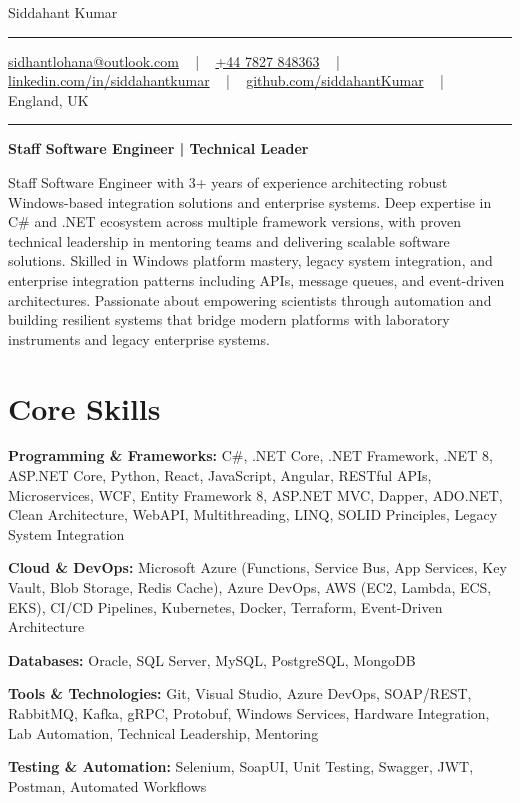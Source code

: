 \documentclass[letterpaper,10pt]{article}
\newcommand{\documentTitle}[2]{
  \begin{center}
    \vspace*{-0.3in}
    {\Huge\color{accentTitle} #1}
    \vspace{8pt}
    {\color{accentLine} \hrule}
    \vspace{2pt}
    \footnotesize{#2}
    \vspace{2pt}
    {\color{accentLine} \hrule}
  \end{center}
}
\newenvironment{resume_list}{
  \vspace{-7pt}
  \begin{itemize}[itemsep=-2px, parsep=1pt, leftmargin=30pt]
}{
  \end{itemize}
}
\begin{document}
\documentTitle{Siddahant Kumar}{
\vspace{0.1cm}
\href{mailto:sidhantlohana@outlook.com}{sidhantlohana@outlook.com} ~ | ~
\href{tel:+447827848363}{+44 7827 848363} ~ | ~
\href{https://www.linkedin.com/in/siddahantkumar/}{linkedin.com/in/siddahantkumar} ~ | ~
\href{https://github.com/siddahantKumar}{github.com/siddahantKumar} ~ | ~
England, UK
}

\begin{center}
\textbf{Staff Software Engineer | Technical Leader}
\end{center}

Staff Software Engineer with 3+ years of experience architecting robust Windows-based integration solutions and enterprise systems. Deep expertise in C\# and .NET ecosystem across multiple framework versions, with proven technical leadership in mentoring teams and delivering scalable software solutions. Skilled in Windows platform mastery, legacy system integration, and enterprise integration patterns including APIs, message queues, and event-driven architectures. Passionate about empowering scientists through automation and building resilient systems that bridge modern platforms with laboratory instruments and legacy enterprise systems.


\section{Core Skills}

\begin{resume_list}
    \item \textbf{Programming \& Frameworks:} C\#, .NET Core, .NET Framework, .NET 8, ASP.NET Core, Python, React, JavaScript, Angular, RESTful APIs, Microservices, WCF, Entity Framework 8, ASP.NET MVC, Dapper, ADO.NET, Clean Architecture, WebAPI, Multithreading, LINQ, SOLID Principles, Legacy System Integration
    \item \textbf{Cloud \& DevOps:} Microsoft Azure (Functions, Service Bus, App Services, Key Vault, Blob Storage, Redis Cache), Azure DevOps, AWS (EC2, Lambda, ECS, EKS), CI/CD Pipelines, Kubernetes, Docker, Terraform, Event-Driven Architecture
    \item \textbf{Databases:} Oracle, SQL Server, MySQL, PostgreSQL, MongoDB
    \item \textbf{Tools \& Technologies:} Git, Visual Studio, Azure DevOps, SOAP/REST, RabbitMQ, Kafka, gRPC, Protobuf, Windows Services, Hardware Integration, Lab Automation, Technical Leadership, Mentoring
    \item \textbf{Testing \& Automation:} Selenium, SoapUI, Unit Testing, Swagger, JWT, Postman, Automated Workflows
\end{resume_list}
\end{document}
